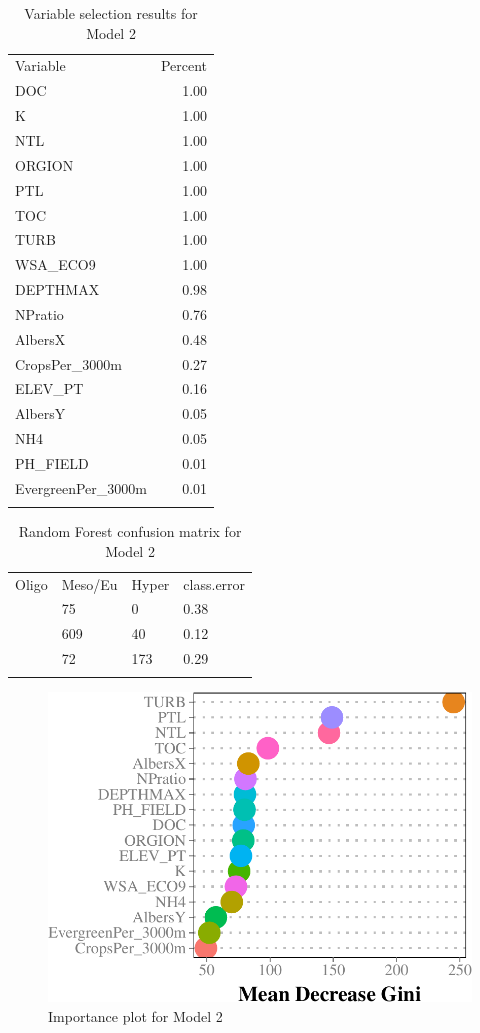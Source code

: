\documentclass[11pt,]{article}
\begin{document}
\begin{longtable}[c]{@{}lr@{}}
\toprule\addlinespace
Variable & Percent
\\\addlinespace
\midrule\endhead
DOC & 1.00
\\\addlinespace
K & 1.00
\\\addlinespace
NTL & 1.00
\\\addlinespace
ORGION & 1.00
\\\addlinespace
PTL & 1.00
\\\addlinespace
TOC & 1.00
\\\addlinespace
TURB & 1.00
\\\addlinespace
WSA\_ECO9 & 1.00
\\\addlinespace
DEPTHMAX & 0.98
\\\addlinespace
NPratio & 0.76
\\\addlinespace
AlbersX & 0.48
\\\addlinespace
CropsPer\_3000m & 0.27
\\\addlinespace
ELEV\_PT & 0.16
\\\addlinespace
AlbersY & 0.05
\\\addlinespace
NH4 & 0.05
\\\addlinespace
PH\_FIELD & 0.01
\\\addlinespace
EvergreenPer\_3000m & 0.01
\\\addlinespace
\bottomrule
\addlinespace
\caption{Variable selection results for Model 2}
\end{longtable}

\begin{longtable}[c]{@{}llll@{}}
\toprule\addlinespace
Oligo & Meso/Eu & Hyper & class.error
\\\addlinespace
\midrule\endhead
121 & 75 & 0 & 0.38
\\\addlinespace
40 & 609 & 40 & 0.12
\\\addlinespace
0 & 72 & 173 & 0.29
\\\addlinespace
\bottomrule
\addlinespace
\caption{Random Forest confusion matrix for Model 2}
\end{longtable}

\begin{figure}[htbp]
\centering
\includegraphics{./manuscript_files/figure-latex/Importance_Model2.pdf}
\caption{Importance plot for Model 2}
\end{figure}
\end{document}
